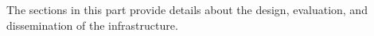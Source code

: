 The sections in this part provide details about the design, evaluation, and dissemination of the infrastructure.